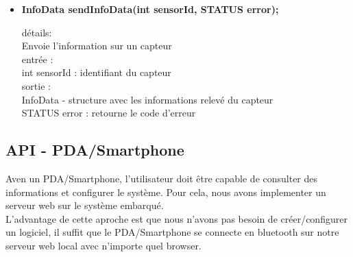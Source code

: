 \begin{itemize}
\item \textbf{InfoData sendInfoData(int sensorId, STATUS error);}
\begin{tabbing}
détails: \=\\
\>		Envoie l'information sur un capteur \\
entrée : \\
\>		int sensorId : identifiant du capteur \\
sortie : \\
\>		InfoData - structure avec les informations relevé du capteur \\
\>		STATUS error : retourne le code d'erreur \\
\end{tabbing}

\end{itemize}

\subsection{API - PDA/Smartphone}

Aven un PDA/Smartphone, l'utilisateur doit être capable de consulter des informations 
et configurer le système. Pour cela, nous avons implementer un serveur web sur le système embarqué. \\
L'advantage de cette aproche est que nous n'avons pas besoin de créer/configurer un logiciel, il suffit que le PDA/Smartphone se connecte en bluetooth sur notre serveur web local avec n'importe quel browser.


\vfill
\pagebreak
